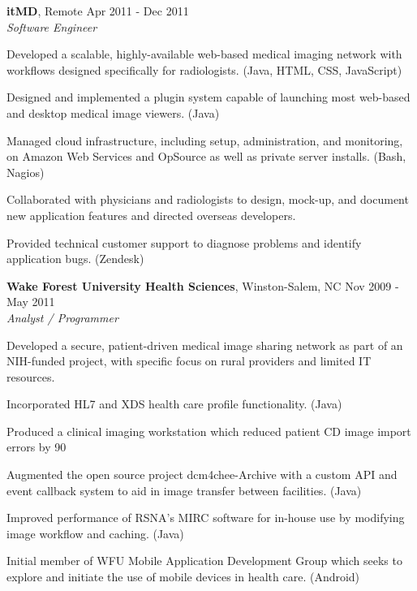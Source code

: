 \documentclass[margin,line]{resume}
\begin{document}
\begin{resume}
  \textbf{itMD}, Remote \hfill Apr 2011 - Dec 2011\vspace{1mm}\\
  \textsl{Software Engineer}\\
  \vspace{-3mm}
  \begin{list2}
\item Developed a scalable, highly-available web-based medical imaging network with
  workflows designed specifically for radiologists. (Java, HTML, CSS,
  JavaScript)
\item Designed and implemented a plugin system capable of launching most web-based
  and desktop medical image viewers. (Java)
\item Managed cloud infrastructure, including setup, administration, and
  monitoring, on Amazon Web Services and OpSource as well as private server
  installs. (Bash, Nagios)
\item Collaborated with physicians and radiologists to design, mock-up, and
  document new application features and directed overseas developers.
\item Provided technical customer support to diagnose problems and identify
  application bugs. (Zendesk)
  \end{list2}

  \textbf{Wake Forest University Health Sciences}, Winston-Salem, NC \hfill Nov 2009 - May 2011\vspace{1mm}\\
  \textsl{Analyst / Programmer}\\
  \vspace{-3mm}
  \begin{list2}
\item Developed a secure, patient-driven medical image sharing network as part of
  an NIH-funded project, with specific focus on rural providers and limited
  IT resources.
\item Incorporated HL7 and XDS health care profile functionality. (Java)
\item Produced a clinical imaging workstation which reduced patient CD image import
  errors by 90%
\item Augmented the open source project dcm4chee-Archive with a custom API and
  event callback system to aid in image transfer between facilities. (Java)
\item Improved performance of RSNA's MIRC software for in-house use by modifying
  image workflow and caching. (Java)
\item Initial member of WFU Mobile Application Development Group which seeks to
  explore and initiate the use of mobile devices in health care. (Android)
  \end{list2}


\end{resume}
\end{document}
